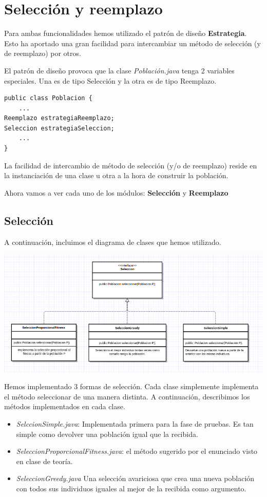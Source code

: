 \documentclass[nochap]{apuntes}
\begin{document}
\section{Selección y reemplazo}
Para ambas funcionalidades hemos utilizado el patrón de diseño \textbf{Estrategia}. Esto ha aportado una gran facilidad para intercambiar un método de selección (y de reemplazo) por otros.

El patrón de diseño provoca que la clase \textit{Población.java} tenga 2 variables especiales. Una es de tipo Selección y la otra es de tipo Reemplazo. 

\begin{lstlisting}
public class Poblacion {
	...
Reemplazo estrategiaReemplazo;
Seleccion estrategiaSeleccion;
    ...
}
\end{lstlisting}

La facilidad de intercambio de método de selección (y/o de reemplazo) reside en la instanciación de una clase u otra a la hora de construir la población.

Ahora vamos a ver cada uno de los módulos: \textbf{Selección} y \textbf{Reemplazo}

\subsection{Selección}

A continuación, incluimos el diagrama de clases que hemos utilizado.

\begin{center}
\includegraphics[scale=0.5]{img/SeleccionUML.png}
\end{center}

Hemos implementado 3 formas de selección. Cada clase simplemente implementa el método seleccionar de una manera distinta. A continuación, describimos los métodos implementados en cada clase.

\begin{itemize}
 	\item \textit{SelccionSimple.java}: Implementada primera para la fase de pruebas. Es tan simple como devolver una población igual que la recibida.
 	\item \textit{SeleccionProporcionalFitness.java}: el método sugerido por el enunciado visto en clase de teoría.
 	\item \textit{SeleccionGreedy.java} Una selección avariciosa que crea una nueva población con todos sus individuos iguales al mejor de la recibida como argumento.
 \end{itemize}  
\end{document}
